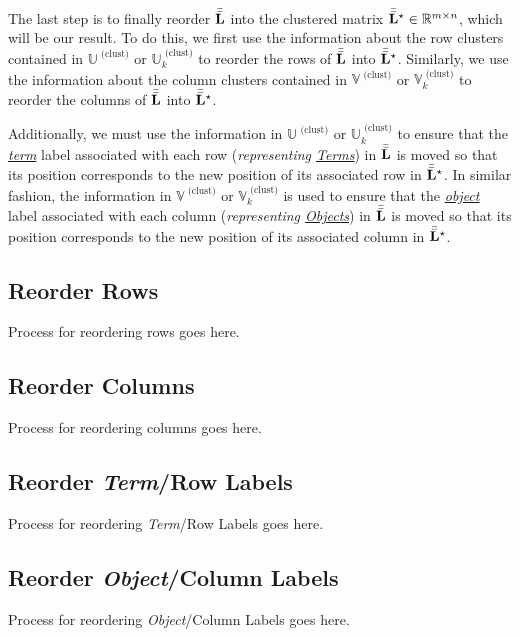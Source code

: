 \documentclass[../../ClusteringConnectionsMAIN.tex]{subfiles}
\begin{document}
\begin{flushleft}
\begin{large}


The last step is to finally reorder $\bar{\bar{\mathbf{L}}}$ into the clustered matrix $\bar{\bar{\mathbf{L}}}^\star \in \mathbb{R}^{m \times n}$, which will be our result. To do this, we first use the information about the row clusters contained in $\mathbb{U}^\text{ (clust)}$  or $\mathbb{U}_k^\text{ (clust)}$ to reorder the rows of $\bar{\bar{\mathbf{L}}}$ into $\bar{\bar{\mathbf{L}}}^\star$.  Similarly, we use the information about the column clusters contained in $\mathbb{V}^\text{ (clust)}$ or $\mathbb{V}_k^\text{ (clust)}$ to reorder the columns of $\bar{\bar{\mathbf{L}}}$ into $\bar{\bar{\mathbf{L}}}^\star$.  \newline

Additionally, we must use the information in $\mathbb{U}^\text{ (clust)}$  or $\mathbb{U}_k^\text{ (clust)}$ to ensure that the \emph{\underline{term}} label associated with each row (\emph{representing \underline{Terms}}) in $\bar{\bar{\mathbf{L}}}$ is moved so that its position corresponds to the new position of its associated row in $\bar{\bar{\mathbf{L}}}^\star$.  In similar fashion, the information in $\mathbb{V}^\text{ (clust)}$  or $\mathbb{V}_k^\text{ (clust)}$ is used to ensure that the \emph{\underline{object}} label associated with each column (\emph{representing \underline{Objects}}) in $\bar{\bar{\mathbf{L}}}$ is moved so that its position corresponds to the new position of its associated column in $\bar{\bar{\mathbf{L}}}^\star$. 


\subsection{Reorder Rows}

Process for reordering rows goes here.


\subsection{Reorder Columns}

Process for reordering columns goes here.


\subsection{Reorder \emph{Term}/Row Labels}

Process for reordering \emph{Term}/Row Labels goes here.


\subsection{Reorder \emph{Object}/Column Labels}

Process for reordering \emph{Object}/Column Labels goes here.


\end{large}
\end{flushleft}
\end{document}
